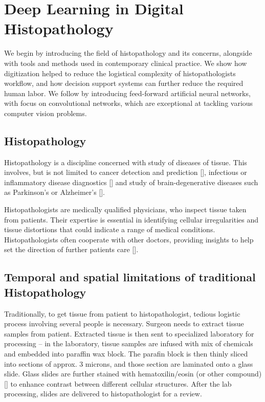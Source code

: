 \chapter{Deep Learning in Digital Histopathology}

We begin by introducing the field of histopathology and its concerns, alongside with tools and methods used in contemporary clinical practice. We show how digitization helped to reduce the logistical complexity of histopathologists workflow, and how decision support systems can further reduce the required human labor. We follow by introducing feed-forward artificial neural networks, with focus on convolutional networks, which are exceptional at tackling various computer vision problems.

\section{Histopathology}

Histopathology is a discipline concerned with study of diseases of tissue. This involves, but is not limited to cancer detection and prediction [], infectious or inflammatory disease diagnostics [] and study of brain-degenerative diseases such as Parkinson's or Alzheimer's [].

Histopathologists are medically qualified physicians, who inspect tissue taken from patients. Their expertise is essential in identifying cellular irregularities and tissue distortions that could indicate a range of medical conditions. Histopathologists often cooperate with other doctors, providing insights to help set the direction of further patients care [].

\section{Temporal and spatial limitations of traditional Histopathology}

Traditionally, to get tissue from patient to histopathologist, tedious logistic process involving several people is necessary. Surgeon needs to extract tissue samples from patient. Extracted tissue is then sent to specialized laboratory for processing -- in the laboratory, tissue samples are infused with mix of chemicals and embedded into paraffin wax block. The parafin block is then thinly sliced into sections of approx. $3$ microns, and those section are laminated onto a glass slide. Glass slides are further stained with hematoxilin/eosin (or other compound) [] to enhance contrast between different cellular structures. After the lab processing, slides are delivered to histopathologist for a review.

